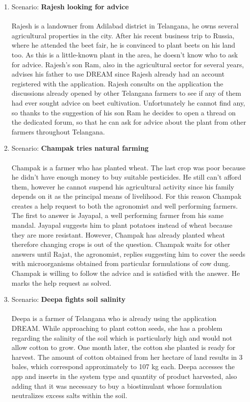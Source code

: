 \begin{enumerate}
\item Scenario: \textbf{Rajesh looking for advice}\\\\
Rajesh is a landowner from Adilabad district in Telangana, he owns several agricultural properties in the city. After his recent business trip to Russia, where he attended the beet fair, he is convinced to plant beets on his land too. As this is a little-known plant in the area, he doesn't know who to ask for advice. Rajesh's son Ram, also in the agricultural sector for several years, advises his father to use DREAM since Rajesh already had an account registered with the application.
Rajesh consults on the application the discussions already opened by other Telangana farmers to see if any of them had ever sought advice on beet cultivation. Unfortunately he cannot find any, so thanks to the suggestion of his son Ram he decides to open a thread on the dedicated forum, so that he can ask for advice about the plant from other farmers throughout Telangana.\\

\newpage

\item Scenario: \textbf{Champak tries natural farming}\\\\
Champak is a farmer who has planted wheat. The last crop was poor because he didn't have enough money to buy suitable pesticides. He still can't afford them, however he cannot suspend his agricultural activity since his family depends on it as the principal means of livelihood. For this reason Champak creates a help request to both the agronomist and well performing farmers. The first to answer is Jayapal, a well performing farmer from his same mandal. Jayapal suggests him to plant potatoes instead of wheat because they are more resistant. However, Champak has already planted wheat therefore changing crops is out of the question. Champak waits for other answers until Rajat, the agronomist, replies suggesting him to cover the seeds with microorganisms obtained from particular formulations of cow dung. Champak is willing to follow the advice and is satisfied with the answer. He marks the help request as solved. 
\\

\item Scenario: \textbf{Deepa fights soil salinity}\\\\
Deepa is a farmer of Telangana who is already using the application DREAM. While approaching to plant cotton seeds, she has a problem regarding the salinity of the soil which is particularly high and would not allow cotton to grow. One month later, the cotton she planted is ready for harvest. The amount of cotton obtained from her hectare of land results in 3 bales, which correspond approximately to 107 kg each. Deepa accesses the app and inserts in the system type and quantity of product harvested, also adding that it was necessary to buy a biostimulant whose formulation neutralizes excess salts within the soil.\\


\end{enumerate}

